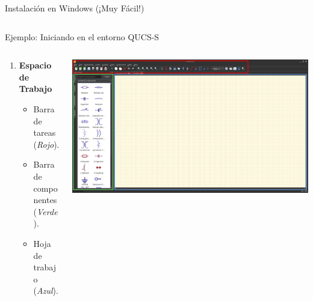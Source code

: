 \documentclass{beamer}
\begin{document}
\begin{frame}[fragile]{Instalación en Windows (¡Muy Fácil!)}
\begin{columns}[T]
\begin{column}{0.5\textwidth}
    \end{column}
    
  \end{columns}
\end{frame}

\begin{frame}[fragile]{Ejemplo: Iniciando en el entorno QUCS-S}

  \begin{columns}[T] %
    
    \begin{column}{0.5\textwidth}
      \begin{enumerate}
        \item \textbf{Espacio de Trabajo}
          \begin{itemize}
            \item Barra de tareas (\textit{Rojo}).
            \item Barra de componentes (\textit{Verde}).
            \item Hoja de trabajo (\textit{Azul}).
          \end{itemize}
      \end{enumerate}
    \end{column}

    \begin{column}{0.5\textwidth}
      \includegraphics[width=\columnwidth]{Imagenes/ToolB.png}
    \end{column}

  \end{columns}
\end{frame}
\end{document}

